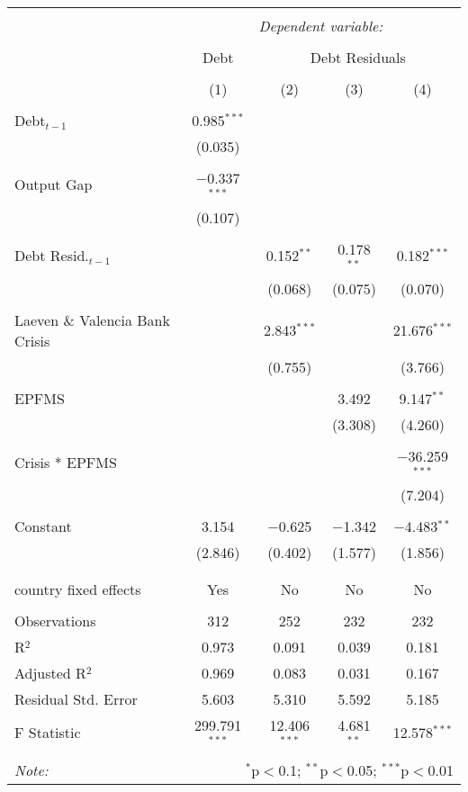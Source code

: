 
\begingroup 
\footnotesize 
\begin{tabular}{@{\extracolsep{5pt}}lcccc} 
\\[-1.8ex]\hline 
\hline \\[-1.8ex] 
 & \multicolumn{4}{c}{\textit{Dependent variable:}} \\ 
\cline{2-5} 
\\[-1.8ex] & Debt & \multicolumn{3}{c}{Debt Residuals} \\ 
\\[-1.8ex] & (1) & (2) & (3) & (4)\\ 
\hline \\[-1.8ex] 
 Debt$_{t-1}$ & 0.985$^{***}$ &  &  &  \\ 
  & (0.035) &  &  &  \\ 
  & & & & \\ 
 Output Gap & $-$0.337$^{***}$ &  &  &  \\ 
  & (0.107) &  &  &  \\ 
  & & & & \\ 
 Debt Resid.$_{t-1}$ &  & 0.152$^{**}$ & 0.178$^{**}$ & 0.182$^{***}$ \\ 
  &  & (0.068) & (0.075) & (0.070) \\ 
  & & & & \\ 
 Laeven \& Valencia Bank Crisis &  & 2.843$^{***}$ &  & 21.676$^{***}$ \\ 
  &  & (0.755) &  & (3.766) \\ 
  & & & & \\ 
 EPFMS &  &  & 3.492 & 9.147$^{**}$ \\ 
  &  &  & (3.308) & (4.260) \\ 
  & & & & \\ 
 Crisis * EPFMS &  &  &  & $-$36.259$^{***}$ \\ 
  &  &  &  & (7.204) \\ 
  & & & & \\ 
 Constant & 3.154 & $-$0.625 & $-$1.342 & $-$4.483$^{**}$ \\ 
  & (2.846) & (0.402) & (1.577) & (1.856) \\ 
  & & & & \\ 
\hline \\[-1.8ex] 
country fixed effects & Yes & No & No & No \\ 
\hline \\[-1.8ex] 
Observations & 312 & 252 & 232 & 232 \\ 
R$^{2}$ & 0.973 & 0.091 & 0.039 & 0.181 \\ 
Adjusted R$^{2}$ & 0.969 & 0.083 & 0.031 & 0.167 \\ 
Residual Std. Error & 5.603 & 5.310 & 5.592 & 5.185 \\ 
F Statistic & 299.791$^{***}$ & 12.406$^{***}$ & 4.681$^{**}$ & 12.578$^{***}$ \\ 
\hline 
\hline \\[-1.8ex] 
\textit{Note:}  & \multicolumn{4}{r}{$^{*}$p$<$0.1; $^{**}$p$<$0.05; $^{***}$p$<$0.01} \\ 
\end{tabular} 
\endgroup 
